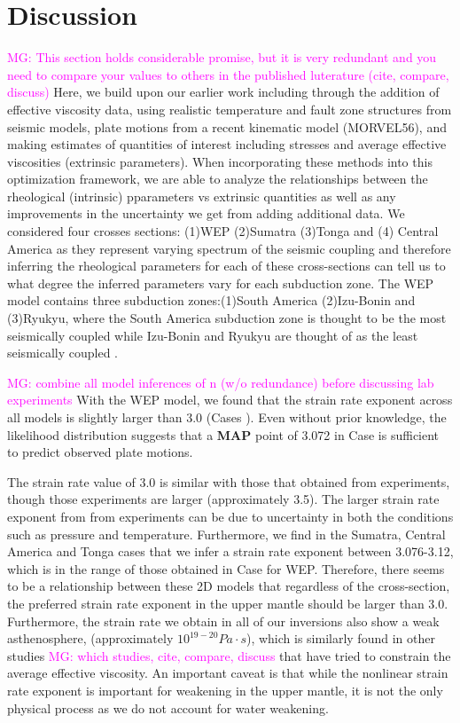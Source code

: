 \documentclass[12pt]{article}
\newcommand{\mgnote}[1]{\textcolor{magenta}{MG: #1}}
\begin{document}
{\section{Discussion}

\mgnote{This section holds considerable promise, but it is very redundant and you need to compare your values to others in the published luterature (cite, compare, discuss)}
Here, we build upon our earlier work \citep{ratnaswamy2015adjoint} including through the addition of effective viscosity data, using realistic temperature and fault zone structures from seismic models, plate motions from a recent kinematic model (MORVEL56), and making estimates of quantities of interest including stresses and average effective viscosities (extrinsic parameters). When incorporating these methods into this optimization framework, we are able to analyze the relationships between the rheological (intrinsic) pparameters vs extrinsic quantities as well as any improvements in the uncertainty we get from adding additional data.
 We considered four crosses sections: (1)WEP (2)Sumatra (3)Tonga and (4) Central America as they represent varying spectrum of the seismic coupling and therefore inferring the rheological parameters for each of these cross-sections can tell us to what degree the inferred parameters vary for each subduction zone. The WEP model contains three subduction zones:(1)South America (2)Izu-Bonin and (3)Ryukyu, where the South America subduction zone is thought to be the most seismically coupled while Izu-Bonin and Ryukyu are thought of as the least seismically coupled \citep{scholz2012seismic}. 

\mgnote{combine all model inferences of n (w/o redundance) before discussing lab experiments} With the WEP model, we found that the strain rate exponent across all models is slightly larger than 3.0 (Cases ). Even without prior knowledge, the likelihood distribution suggests that a \textbf{MAP} point of 3.072 in Case is sufficient to predict observed plate motions. 
  
  The strain rate value of 3.0 is similar with those that obtained from experiments, though those experiments are larger (approximately 3.5). The larger strain rate exponent from from experiments can be due to uncertainty in both the conditions such as pressure and temperature. Furthermore, we find in the Sumatra, Central America and Tonga cases that we infer a strain rate exponent between 3.076-3.12, which is in the range of those obtained in Case for WEP. Therefore, there seems to be a relationship between these 2D models that regardless of the cross-section, the preferred strain rate exponent in the upper mantle should be larger than 3.0. Furthermore, the strain rate we obtain in all of our inversions also show a weak asthenosphere, (approximately $10^{19-20}Pa\cdot s$), which is similarly found in other studies \mgnote{which studies, cite, compare, discuss} that have tried to constrain the average effective viscosity. An important caveat is that while the nonlinear strain rate exponent is important for weakening in the upper mantle, it is not the only physical process as we do not account for water weakening.
  
}
\end{document}
